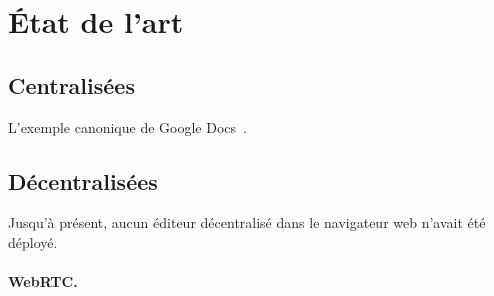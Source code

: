 
\section{État de l'art}


\subsection{Centralisées}

L'exemple canonique de Google Docs~\cite{googledocs}.

\subsection{Décentralisées}

Jusqu'à présent, aucun éditeur décentralisé dans le navigateur web n'avait été
déployé.

\paragraph{WebRTC.}

